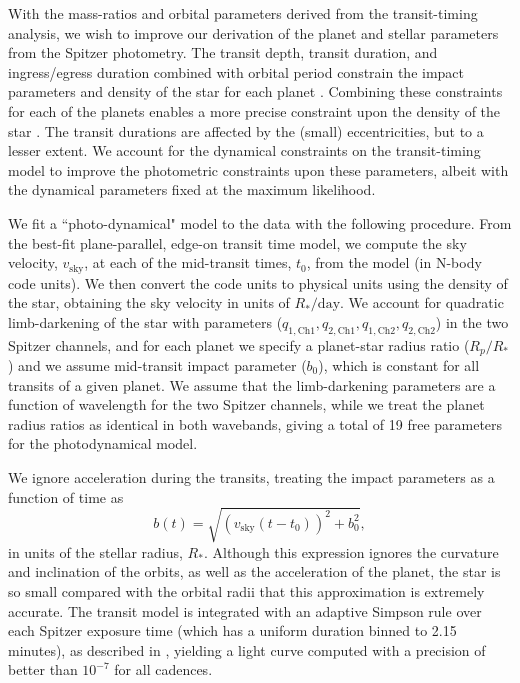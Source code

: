 \documentclass[twocolumn]{aastex63}
\begin{document}
With the mass-ratios and orbital parameters derived from the transit-timing
analysis, we wish to improve our derivation of the planet and stellar parameters
from the Spitzer photometry.   The transit depth, transit duration, and ingress/egress
duration combined with  orbital period constrain the impact parameters and density
of the star for each planet \citep{Seager2003}.  Combining these constraints for
each of the planets  enables a more precise constraint upon the density of the
star \citep{Kipping2012a}.
The transit durations are affected by the (small) eccentricities, but to a lesser extent.  We account
for the dynamical constraints on the transit-timing model to improve the
photometric constraints upon these parameters, albeit with the dynamical parameters fixed
at the maximum likelihood.

We fit a ``photo-dynamical" model \citep{Carter2012} to the data with the following procedure.
From the best-fit plane-parallel, edge-on transit time model,
we compute the sky velocity, $v_\mathrm{sky}$, at each of the mid-transit times, $t_0$,
from the model (in N-body code units).  We then convert the code units to physical
units using the density of the star, obtaining the sky velocity in units
of $R_*/\mathrm{day}$.
We account for quadratic limb-darkening of the star with parameters ($q_\mathrm{1,Ch1}, q_\mathrm{2,Ch1},q_\mathrm{1,Ch2},q_\mathrm{2,Ch2}$) in the two Spitzer channels, and for each
planet we specify a planet-star radius ratio ($R_p/R_*$) and we assume
mid-transit impact parameter ($b_0$), which is constant for all transits of
a given planet.  We assume that the limb-darkening parameters are a function
of wavelength for the two Spitzer channels, while we treat the planet radius
ratios as identical in both wavebands, giving a total of 19 free parameters
for the photodynamical model.

We ignore acceleration during the transits, treating the impact parameters as
a function of time as
\begin{equation}
    b(t) = \sqrt{(v_\mathrm{sky} (t-t_0))^2 + b_0^2},
\end{equation}
in units of the stellar radius, $R_*$.
Although this expression ignores the curvature and inclination of the orbits, as well
as the acceleration of the planet, the star is so small compared with the orbital
radii that this approximation is extremely accurate.  The transit model is integrated
with an adaptive Simpson rule over each Spitzer exposure time (which has a uniform
duration binned to 2.15 minutes), as described in \citet{Agol2019}, yielding
a light curve computed with a precision of better than $10^{-7}$ for all cadences.
\end{document}
